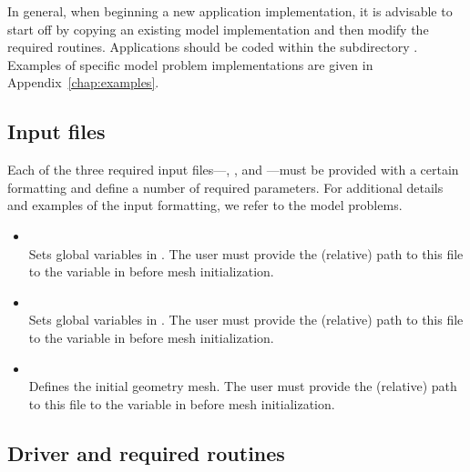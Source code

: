 In general, when beginning a new application implementation, it is advisable to start off by copying an existing model implementation and then modify the required routines. Applications should be coded within the subdirectory . Examples of specific model problem implementations are given in Appendix~\ref{chap:examples}.

\subsection{Input files}

Each of the three required input files---, , and ---must be provided with a certain formatting and define a number of required parameters. For additional details and examples of the input formatting, we refer to the model problems.

\begin{itemize}
	\item{ 
		\\
		Sets global variables in  . The user must provide the (relative) path to this file to the  variable in   before mesh initialization.
	}\item{
		\\
		Sets global variables in  . The user must provide the (relative) path to this file to the  variable in   before mesh initialization.
	}\item{
		\\
		Defines the initial geometry mesh. The user must provide the (relative) path to this file to the  variable in   before mesh initialization.
	}
\end{itemize}

\subsection{Driver and required routines}

